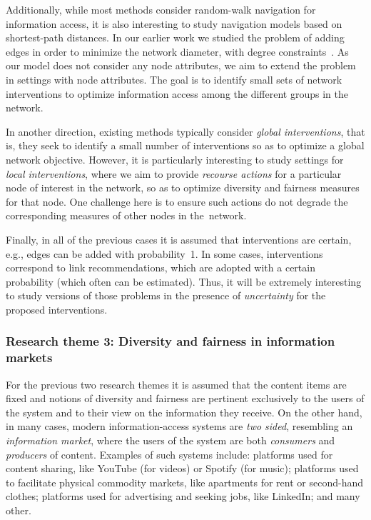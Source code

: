 \documentclass[a4paper,11pt]{article}
\begin{document}
Additionally, while most methods consider random-walk navigation for information access, 
it is also interesting to study navigation models based on shortest-path distances. 
In our earlier work we studied the problem of adding edges in order to minimize the network diameter, 
with degree constraints~\cite{adriaens2022diameter}.
As our model does not consider any node attributes, 
we aim to extend the problem in settings with node attributes. 
The goal is to identify small sets of network interventions
to optimize information access among the different groups in the network.

In another direction, existing methods typically consider \emph{global interventions}, 
that is, they seek to identify a small number of interventions so as to 
optimize a global network objective. 
However, it is particularly interesting to study settings for \emph{local interventions}, 
where we aim to provide \emph{recourse actions} for a particular node of interest in the network, 
so as to optimize diversity and fairness measures for that node. 
One challenge here is to ensure such actions do not degrade 
the corresponding measures of other nodes in the~network. 

Finally, in all of the previous cases it is assumed that interventions are certain, 
e.g., edges can be added with probability~1.
In some cases, interventions correspond to link recommendations, 
which are adopted with a certain probability
(which often can be estimated).
Thus, it will be extremely interesting to study versions of those problems
in the presence of \emph{uncertainty} for the proposed interventions.


\subsubsection*{Research theme 3: Diversity and fairness in information markets}

For the previous two research themes it is assumed that the content items are fixed
and notions of diversity and fairness are pertinent exclusively to the users of the 
system and to their view on the information they receive.
On the other hand, in many cases, modern information-access systems are \emph{two sided},
resembling an \emph{information market}, 
where the users of the system are both \emph{consumers} and \emph{producers} of content.
Examples of such systems include:
platforms used for content sharing, like YouTube (for videos) or Spotify (for music);
platforms used to facilitate physical commodity markets, like apartments for rent or second-hand clothes; 
platforms used for advertising and seeking jobs, like LinkedIn; and many other.
\end{document}
